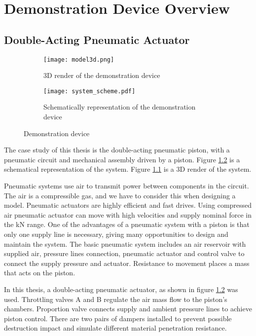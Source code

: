 \chapter{Demonstration Device Overview}

\section{Double-Acting Pneumatic Actuator}
\begin{figure}[h!]
    \centering
    \begin{subfigure}[b]{0.3\textwidth}
        \centering
        \texttt{[image: model3d.png]}
        \caption{3D render of the demonstration device}
        \label{fig:3d}
    \end{subfigure} 
    \hfill
    \begin{subfigure}[b]{0.6\textwidth}
        \centering
        \texttt{[image: system\_scheme.pdf]}
        \caption{Schematically representation of the demonstration device}
        \label{fig:device_scheme}
    \end{subfigure}
    \caption{Demonstration device}
    \label{fig:device}
\end{figure}

The case study of this thesis is the double-acting pneumatic piston, with a
pneumatic circuit and mechanical assembly driven by a piston.  Figure
\ref{fig:device_scheme} is a schematical representation of the system.
Figure \ref{fig:3d} is a 3D render of the system.

Pneumatic systems use air to transmit power between components in the
circuit. The air is a compressible gas, and we have to consider this when
designing a model. Pneumatic actuators are highly efficient and fast
drives. Using compressed air pneumatic actuator can move with high
velocities and supply nominal force in the kN range. One of the advantages
of a pneumatic system with a piston is that only one supply line is
necessary, giving many opportunities to design and maintain the system.
The basic pneumatic system includes an air reservoir with supplied air,
pressure lines connection, pneumatic actuator and control valve to connect
the supply pressure and actuator. Resistance to movement places a mass that
acts on the piston. 

In this thesis, a double-acting pneumatic actuator, as shown in figure
\ref{fig:device_scheme} was used. Throttling valves A and B regulate the air mass flow to
the piston's chambers. Proportion valve connects supply and ambient
pressure lines to achieve piston control. There are two pairs of dampers
installed to prevent possible destruction impact and simulate different
material penetration resistance.

